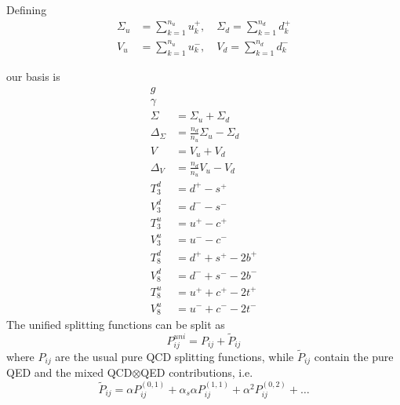 \documentclass[a4paper,oneside]{article}
\title{}
\author{}
\date{}
\begin{document}
Defining
\begin{align*}
\Sigma_u&=\sum_{k=1}^{n_u}u_k^+,  \quad \Sigma_d=\sum_{k=1}^{n_d}d_k^+ \\
V_u&=\sum_{k=1}^{n_u}u_k^-, \quad V_d=\sum_{k=1}^{n_d}d_k^-
\end{align*}

our basis is
\begin{align*}
g & \\
\gamma & \\
\Sigma &= \Sigma_u + \Sigma_d \\
\Delta_\Sigma & = \frac{n_d}{n_u}\Sigma_u - \Sigma_d \\
V & = V_u + V_d \\
\Delta_V & = \frac{n_d}{n_u}V_u - V_d \\
T_3^d &=d^+ - s^+ \\
V_3^d &=d^- - s^- \\
T_3^u &=u^+ - c^+ \\
V_3^u &=u^- - c^- \\
T_8^d &=d^+ + s^+ - 2b^+ \\
V_8^d &=d^- + s^- - 2b^- \\
T_8^u &=u^+ + c^+ - 2t^+ \\
V_8^u &=u^- + c^- - 2t^-
\end{align*}
The unified splitting functions can be split as
\begin{equation*}
P^{uni}_{ij} = P_{ij}+\tilde{P}_{ij}
\end{equation*}
where $P_{ij}$ are the usual pure QCD splitting functions, while $\tilde{P}_{ij}$ contain the pure QED and the mixed QCD$\otimes$QED contributions, i.e.\
\begin{equation*}
\tilde{P}_{ij} = \alpha P^{(0,1)}_{ij} +\alpha_s \alpha P^{(1,1)}_{ij} + \alpha^2 P^{(0,2)}_{ij} + \dots
\end{equation*}
\end{document}

